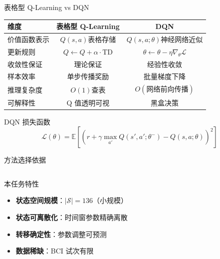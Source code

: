 {\begin{frame}{表格型 Q-Learning vs DQN}
    \begin{center}
    \footnotesize
    \renewcommand{\arraystretch}{1.4}
    \begin{tabular}{l|cc}
        \hline
        \textbf{维度} & \textbf{表格型 Q-Learning} & \textbf{DQN}\cite{mnih2015human} \\
        \hline
        价值函数表示 & $Q(s,a)$表格存储 & $Q(s,a;\theta)$神经网络近似 \\
        更新规则 & $Q \leftarrow Q + \alpha \cdot \text{TD}$ & $\theta \leftarrow \theta - \eta \nabla_\theta \mathcal{L}$ \\
        收敛性保证 & 理论保证\cite{watkins1992q} & 经验性收敛 \\
        样本效率 & 单步传播奖励 & 批量梯度下降 \\
        推理复杂度 & $O(1)$查表 & $O(\text{网络前向传播})$ \\
        可解释性 & Q 值透明可视 & 黑盒决策 \\
        \hline
    \end{tabular}
    \end{center}

    \vspace{0.2cm}
    \begin{alertblock}{DQN 损失函数}
        \footnotesize
        \begin{equation*}
        \mathcal{L}(\theta) = \mathbb{E}\left[ \left( r + \gamma \max_{a'} Q(s', a'; \theta^-) - Q(s, a; \theta) \right)^2 \right]
        \end{equation*}
    \end{alertblock}
\end{frame}

\begin{frame}{方法选择依据}
    \begin{columns}[T]
        \begin{block}{本任务特性}
            \footnotesize
            \begin{itemize}
                \item \textbf{状态空间规模}：$|\mathcal{S}| = 136$（小规模）
                \item \textbf{状态可离散化}：时间窗参数精确离散
                \item \textbf{转移确定性}：参数调整可预测
                \item \textbf{数据稀缺}：BCI 试次有限
            \end{itemize}
        \end{block}


\end{columns}
\end{frame}}
